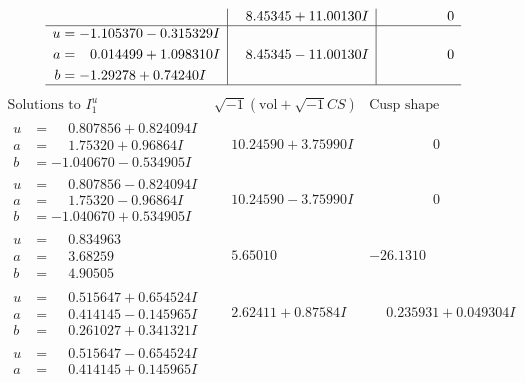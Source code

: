\documentclass[1p]{elsarticle_modified}
\theoremstyle{definition}
\newcommand{\I}{\sqrt{-1}}
\begin{document}
$$\begin{array}{c|c|c}
 & \phantom{-}8.45345 + 11.00130 I & \phantom{-0.000000 } 0 \\ \hline\begin{aligned}
u &= -1.105370 - 0.315329 I \\
a &= \phantom{-}0.014499 + 1.098310 I \\
b &= -1.29278 + 0.74240 I\end{aligned}
 & \phantom{-}8.45345 - 11.00130 I & \phantom{-0.000000 } 0\\
 \hline 
 \end{array}$$\newpage$$\begin{array}{c|c|c}  
\text{Solutions to }I^u_{1}& \I (\text{vol} + \sqrt{-1}CS) & \text{Cusp shape}\\
 \hline 
\begin{aligned}
u &= \phantom{-}0.807856 + 0.824094 I \\
a &= \phantom{-}1.75320 + 0.96864 I \\
b &= -1.040670 - 0.534905 I\end{aligned}
 & \phantom{-}10.24590 + 3.75990 I & \phantom{-0.000000 } 0 \\ \hline\begin{aligned}
u &= \phantom{-}0.807856 - 0.824094 I \\
a &= \phantom{-}1.75320 - 0.96864 I \\
b &= -1.040670 + 0.534905 I\end{aligned}
 & \phantom{-}10.24590 - 3.75990 I & \phantom{-0.000000 } 0 \\ \hline\begin{aligned}
u &= \phantom{-}0.834963\phantom{ +0.000000I} \\
a &= \phantom{-}3.68259\phantom{ +0.000000I} \\
b &= \phantom{-}4.90505\phantom{ +0.000000I}\end{aligned}
 & \phantom{-}5.65010\phantom{ +0.000000I} & -26.1310\phantom{ +0.000000I} \\ \hline\begin{aligned}
u &= \phantom{-}0.515647 + 0.654524 I \\
a &= \phantom{-}0.414145 - 0.145965 I \\
b &= \phantom{-}0.261027 + 0.341321 I\end{aligned}
 & \phantom{-}2.62411 + 0.87584 I & \phantom{-}0.235931 + 0.049304 I \\ \hline\begin{aligned}
u &= \phantom{-}0.515647 - 0.654524 I \\
a &= \phantom{-}0.414145 + 0.145965 I \\

\end{aligned}
\end{array}$$
\end{document}
